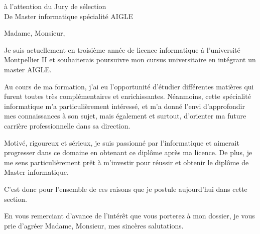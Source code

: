 \documentclass[12pt,a4paper]{lettre}
\begin{document}
\begin{letter}{
à l'attention du Jury de sélection\\
De Master informatique spécialité AIGLE
}

\date{le 14/10/2012}


\opening{Madame, Monsieur,}

Je suis actuellement en troisième année de licence informatique à l’université Montpellier II
et souhaiterais poursuivre mon cursus universitaire en intégrant un master AIGLE.

Au cours de ma formation, j’ai eu l’opportunité d’étudier différentes matières qui furent
toutes très complémentaires et enrichissantes. Néanmoins, cette spécialité informatique m’a
particulièrement intéressé, et m’a donné l’envi d’approfondir mes connaissances à son sujet, mais
également et surtout, d’orienter ma future carrière professionnelle dans sa direction.

Motivé, rigoureux et sérieux, je suis passionné par l’informatique et aimerait progresser dans
ce domaine en obtenant ce diplôme après ma licence. De plus, je me sens particulièrement prêt à
m’investir pour réussir et obtenir le diplôme de Master informatique.

C’est donc pour l’ensemble de ces raisons que je postule aujourd’hui dans cette section.

\closing{En vous remerciant d’avance de l’intérêt que vous porterez à mon dossier, je vous prie
d’agréer Madame, Monsieur, mes sincères salutations.}


\end{letter}
\end{document}
